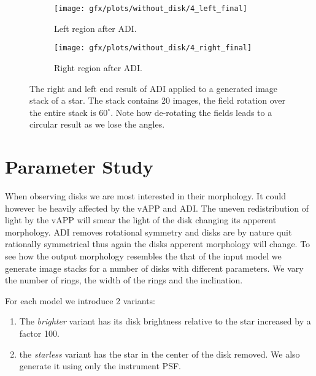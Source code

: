 \begin{figure}[h!]
      \begin{subfigure}[b]{0.5\textwidth}
        \texttt{[image: gfx/plots/without\_disk/4\_left\_final]}
        \caption{Left region after \ac{ADI}.}
      \end{subfigure}%
      \begin{subfigure}[b]{0.5\textwidth}
        \texttt{[image: gfx/plots/without\_disk/4\_right\_final]}
        \caption{Right region after \ac{ADI}.}
      \end{subfigure}      

  \caption{The right and left end result of \ac{ADI} applied to a generated image stack of a star. The stack contains 20 images, the field rotation over the entire stack is $60^{\circ}$. Note how de-rotating the fields leads to a circular result as we lose the angles.}
  \label{fig:adi_star_only}
\end{figure}

\section{Parameter Study}
\label{sec:paramstudy}
When observing disks we are most interested in their morphology. It could however be heavily affected by the \ac{vAPP} and \ac{ADI}. The uneven redistribution of light by the \ac{vAPP} will smear the light of the disk changing its apperent morphology. \ac{ADI} removes rotational symmetry and disks are by nature quit rationally symmetrical thus again the disks apperent morphology will change. To see how the output morphology resembles the that of the input model we generate image stacks for a number of disks with different parameters. We vary the number of rings, the width of the rings and the inclination.

For each model we introduce 2 variants:

\begin{enumerate}[I]
\item The \textit{brighter} variant has its disk brightness relative to the star increased by a factor 100.
\item the \textit{starless} variant has the star in the center of the disk removed. We also generate it using only the instrument \ac{PSF}.
\end{enumerate}


